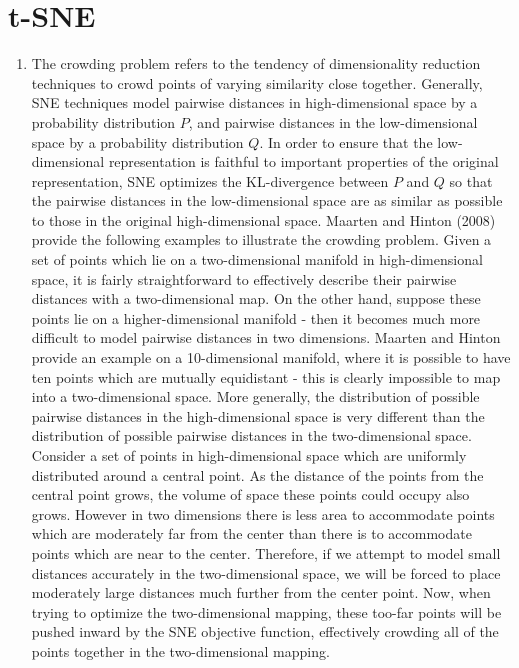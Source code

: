 \documentclass[a4paper]{article}
\begin{document}
\section{t-SNE}
\begin{enumerate}
\item{
The crowding problem refers to the tendency of dimensionality reduction techniques to crowd points of varying similarity close together.  Generally, SNE techniques model pairwise distances in high-dimensional space by a probability distribution $P$, and pairwise distances in the low-dimensional space by a probability distribution $Q$. In order to ensure that the low-dimensional representation is faithful to important properties of the original representation, SNE optimizes the KL-divergence between $P$ and $Q$ so that the pairwise distances in the low-dimensional space are as similar as possible to those in the original high-dimensional space. 
\newline
\newline
Maarten and Hinton (2008) provide the following examples to illustrate the crowding problem. Given a set of points which lie on a two-dimensional manifold in high-dimensional space, it is fairly straightforward to effectively describe their pairwise distances with a two-dimensional map. On the other hand, suppose these points lie on a higher-dimensional manifold - then it becomes much more difficult to model pairwise distances in two dimensions. Maarten and Hinton provide an example on a 10-dimensional manifold, where it is possible to have ten points which are mutually equidistant - this is clearly impossible to map into a two-dimensional space. 
\newline
\newline
More generally, the distribution of possible pairwise distances in the high-dimensional space is very different than the distribution of possible pairwise distances in the two-dimensional space. Consider a set of points in high-dimensional space which are uniformly distributed around a central point. As the distance of the points from the central point grows, the volume of space these points could occupy also grows. However in two dimensions there is less area to accommodate points which are moderately far from the center than there is to accommodate points which are near to the center. Therefore, if we attempt to model small distances accurately in the two-dimensional space, we will be forced to place moderately large distances much further from the center point. Now, when trying to optimize the two-dimensional mapping, these too-far points will be pushed inward by the SNE objective function, effectively crowding all of the points together in the two-dimensional mapping.
}
\end{enumerate}
\end{document}
